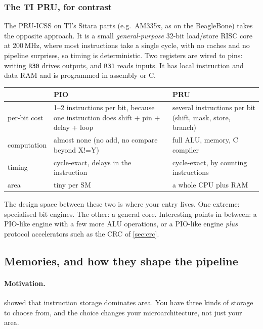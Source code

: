 \subsubsection{The TI PRU, for contrast}
The PRU-ICSS on TI's Sitara parts (e.g.\ AM335x, as on the BeagleBone)
takes the opposite approach. It is a small \emph{general-purpose} 32-bit
load/store RISC core at 200\,MHz, where most instructions take a single
cycle, with no caches and no pipeline surprises, so timing is deterministic.
Two registers are wired to pins: writing \texttt{R30} drives outputs, and
\texttt{R31} reads inputs. It has local instruction and data RAM and is
programmed in assembly or C.
\begin{center}
\begin{tabular}{|p{3.2cm}|p{5.2cm}|p{5.2cm}|}
\hline
& PIO & PRU \\ \hline
per-bit cost & 1--2 instructions per bit, because one instruction does
  shift + pin + delay + loop & several instructions per bit (shift, mask,
  store, branch) \\
computation & almost none (no add, no compare beyond X!=Y) & full ALU,
  memory, C compiler \\
timing & cycle-exact, delays in the instruction & cycle-exact, by counting
  instructions \\
area & tiny per SM & a whole CPU plus RAM \\ \hline
\end{tabular}
\end{center}
The design space between these two is where your entry lives. One
extreme: specialised bit engines. The other: a general core.
Interesting points in between: a PIO-like engine with a few more ALU
operations, or a PIO-like engine \emph{plus} protocol accelerators such as
the CRC of \cref{sec:crc}.

\subsection{Memories, and how they shape the pipeline}\label{sec:memory}

\paragraph{Motivation.}  showed that instruction storage
dominates area. You have three kinds of storage to choose from, and the
choice changes your microarchitecture, not just your area.

